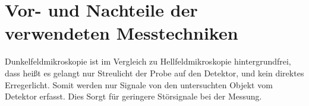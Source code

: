 
\section{Vor- und Nachteile der verwendeten Messtechniken}

Dunkelfeldmikroskopie ist im Vergleich zu Hellfeldmikroskopie hintergrundfrei, dass heißt es gelangt nur Streulicht der Probe auf den Detektor, und kein direktes Erregerlicht. Somit werden nur Signale von den untersuchten Objekt vom Detektor erfasst. Dies Sorgt für geringere Störsignale bei der Messung.